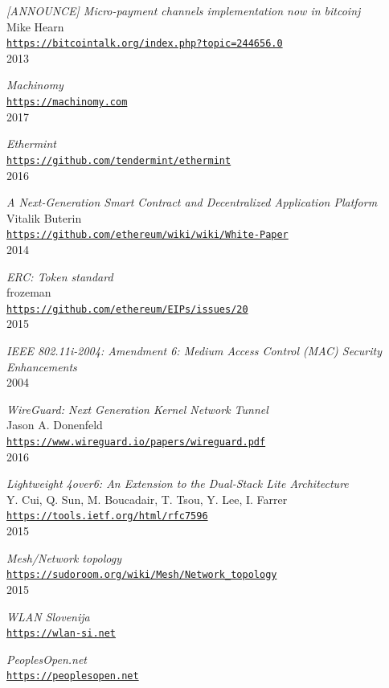 \documentclass[11pt]{article}
\begin{document}
\begin{thebibliography}{99}
\emph{[ANNOUNCE] Micro-payment channels implementation now in bitcoinj}\\
Mike Hearn\\
\texttt{\url{https://bitcointalk.org/index.php?topic=244656.0}}\\
2013

\emph{Machinomy}\\
\texttt{\url{https://machinomy.com}}\\
2017

\emph{Ethermint}\\
\texttt{\url{https://github.com/tendermint/ethermint}}\\
2016

\emph{A Next-Generation Smart Contract and Decentralized Application Platform}\\
Vitalik Buterin\\
\texttt{\url{https://github.com/ethereum/wiki/wiki/White-Paper}}\\
2014

\emph{ERC: Token standard}\\
frozeman\\
\texttt{\url{https://github.com/ethereum/EIPs/issues/20}}\\
2015

\emph{IEEE 802.11i-2004: Amendment 6: Medium Access Control (MAC) Security Enhancements}\\
2004

\emph{WireGuard: Next Generation Kernel Network Tunnel}\\
Jason A. Donenfeld\\
\texttt{\url{https://www.wireguard.io/papers/wireguard.pdf}}\\
2016

\emph{Lightweight 4over6: An Extension to the Dual-Stack Lite Architecture}\\
Y. Cui, Q. Sun, M. Boucadair, T. Tsou, Y. Lee, I. Farrer\\
\texttt{\url{https://tools.ietf.org/html/rfc7596}}\\
2015

\emph{Mesh/Network topology}\\
\texttt{\url{https://sudoroom.org/wiki/Mesh/Network_topology}}\\
2015

\emph{WLAN Slovenija}\\
\texttt{\url{https://wlan-si.net}}

\emph{PeoplesOpen.net}\\
\texttt{\url{https://peoplesopen.net}}

\end{thebibliography}
\end{document}
